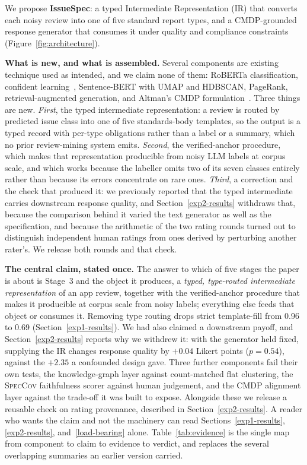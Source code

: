 \documentclass[preprint,12pt]{elsarticle}
\begin{document}
We propose \textbf{IssueSpec}: a typed Intermediate Representation (IR) that converts each noisy
review into one of five standard report types, and a CMDP-grounded response generator that
consumes it under quality and compliance constraints (Figure~\ref{fig:architecture}).

\textbf{What is new, and what is assembled.} Several components are existing technique used as
intended, and we claim none of them: RoBERTa classification, confident
learning~\cite{northcutt2021confident}, Sentence-BERT with UMAP and HDBSCAN, PageRank,
retrieval-augmented generation, and Altman's CMDP formulation~\cite{altman2021constrained}. Three
things are new. \emph{First}, the typed intermediate representation: a review is routed by
predicted issue class into one of five standards-body templates, so the output is a typed record
with per-type obligations rather than a label or a summary, which no prior review-mining system
emits. \emph{Second}, the verified-anchor procedure, which makes that representation producible
from noisy LLM labels at corpus scale, and which works because the labeller omits two of its seven
classes entirely rather than because its errors concentrate on rare ones. \emph{Third}, a
correction and the check that produced it: we previously reported that the typed intermediate
carries downstream response quality, and Section~\ref{exp2-results} withdraws that, because the
comparison behind it varied the text generator as well as the specification, and because the
arithmetic of the two rating rounds turned out to distinguish independent human ratings from ones
derived by perturbing another rater's. We release both rounds and that check.

\textbf{The central claim, stated once.} The answer to which of five stages the paper is about is
Stage~3 and the object it produces, a \emph{typed, type-routed intermediate representation} of an
app review, together with the verified-anchor procedure that makes it producible at corpus scale
from noisy labels; everything else feeds that object or consumes it. Removing type routing drops
strict template-fill from 0.96 to 0.69 (Section~\ref{exp1-results}). We had also claimed a
downstream payoff, and Section~\ref{exp2-results} reports why we withdrew it: with the generator
held fixed, supplying the IR changes response quality by $+0.04$ Likert points ($p = 0.54$),
against the $+2.35$ a confounded design gave. Three further components fail their own tests, the
knowledge-graph layer against count-matched flat clustering, the \textsc{SpecCov} faithfulness
scorer against human judgement, and the CMDP alignment layer against the trade-off it was built to
expose. Alongside these we release a reusable check on rating provenance, described in
Section~\ref{exp2-results}. A reader who wants the claim and not the machinery can read
Sections~\ref{exp1-results}, \ref{exp2-results}, and~\ref{load-bearing} alone.
Table~\ref{tab:evidence} is the single map from component to claim to evidence to verdict, and
replaces the several overlapping summaries an earlier version carried.
\end{document}
